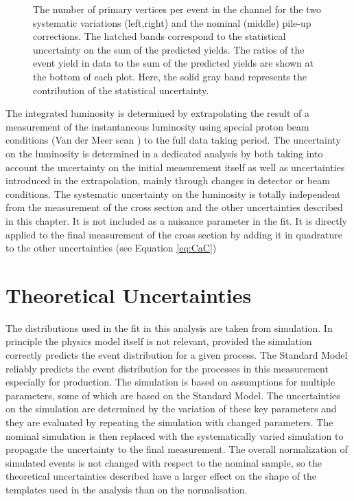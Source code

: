 \begin{figure}[htbp!]
\begin{center}
\caption{The number of primary vertices per event in the \emu channel for the two systematic variations (left,right) and the nominal (middle) pile-up corrections.
The hatched bands correspond to the statistical uncertainty on the sum of the predicted yields. 
        The ratios of the event yield in data to the sum of the predicted yields are
        shown at the bottom of each plot. Here, the solid gray band
        represents the contribution of the statistical uncertainty.
  \label{fig:control_var_PU}}
  \end{center}
\end{figure}


The integrated luminosity is determined by extrapolating the result of a measurement  of the instantaneous luminosity using special proton beam conditions (Van der Meer scan \cite{Zanetti:1357856}) to the full data taking period.
The uncertainty on the luminosity is determined in a dedicated analysis by both taking into account the uncertainty on the initial measurement itself as well as uncertainties
introduced in the extrapolation, mainly through changes in detector or beam conditions.
The systematic uncertainty on the luminosity is totally independent from the measurement of the \ttbar cross section and the other uncertainties described in this chapter.
It is not included as a nuisance parameter in the fit. It is directly applied to the final measurement of the \ttbar cross section by adding it in quadrature to the other uncertainties (see Equation \ref{eq:CaC})

\section{Theoretical Uncertainties}
\label{sec:theo_uncert}

The distributions used in the fit in this analysis are taken from simulation. In principle the physics model itself is not relevant, provided the simulation correctly predicts the event distribution for a given process.
The Standard Model reliably predicts the event distribution for the processes in this measurement especially for \ttbar production.
The simulation is based on assumptions for multiple parameters, some of which are based on the Standard Model. The uncertainties on the simulation are determined by the variation of these key parameters and they are
evaluated by repeating the simulation with changed parameters. The nominal simulation is then replaced with the systematically varied simulation to propagate the uncertainty to the final measurement.
The overall normalization of simulated \ttbar events is not changed with respect to the nominal sample, so the theoretical uncertainties described have a larger effect on the shape of the templates used
in the analysis than on the normalisation.

